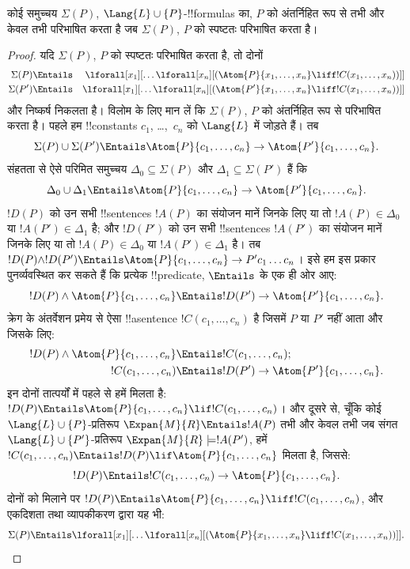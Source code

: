 \documentclass[../../../include/open-logic-section]{subfiles}
\begin{document}
\begin{thm}[बेथ का परिभाषणीयता प्रमेय] कोई समुच्चय $\Sigma(P)$,
  $\Lang{L}
  \cup\{P\}$-!!{formula}s का, $P$ को अंतर्निहित रूप से तभी और केवल तभी
  परिभाषित करता है जब $\Sigma(P)$, $P$ को स्पष्टतः परिभाषित करता है।
\end{thm}

\begin{proof}
यदि $\Sigma(P)$, $P$ को स्पष्टतः परिभाषित करता है, तो दोनों
\begin{align*}
  \Sigma(P) & \Entails & \lforall[x_1][\dots \lforall[x_n]
    [(\Atom{P}{x_1,\dots, x_n} \liff !C(x_1,\dots,x_n))]]\\
  \Sigma(P') & \Entails & \lforall[x_1][\dots \lforall[x_n]
    [(\Atom{P'}{x_1,\dots, x_n} \liff !C(x_1,\dots,x_n))]]
\end{align*}
और निष्कर्ष निकलता है। विलोम के लिए मान लें कि $\Sigma(P)$, $P$ को
अंतर्निहित रूप से परिभाषित करता है। पहले हम !!{constant}s $c_1$,
\dots,~$c_n$ को $\Lang{L}$ में जोड़ते हैं। तब
\[
\Sigma(P) \cup \Sigma(P') \Entails
\Atom{P}{c_1, \dots, c_n} \to  \Atom{P'}{c_1, \dots, c_n}.
\]
संहतता से ऐसे परिमित समुच्चय $\Delta_0 \subseteq \Sigma(P)$ और
$\Delta_1 \subseteq \Sigma(P')$ हैं कि
\[
\Delta_0 \cup \Delta_1 \Entails
\Atom{P}{c_1, \dots, c_n} \to \Atom{P'}{c_1, \dots, c_n}.
\]
$!D(P)$ को उन सभी !!{sentence}s $!A(P)$ का संयोजन मानें जिनके लिए या तो
$!A(P) \in \Delta_0$ या $!A(P') \in \Delta_1$ है; और $!D(P')$ को उन
सभी !!{sentence}s $!A(P')$ का संयोजन मानें जिनके लिए या तो
$!A(P) \in \Delta_0$ या $!A(P') \in \Delta_1$ है। तब $!D(P) \land
!D(P') \Entails \Atom{P}{c_1, \dots, c_n} \to P'c_1\dots c_n$। इसे
हम इस प्रकार पुनर्व्यवस्थित कर सकते हैं कि प्रत्येक !!{predicate},
$\Entails$ के एक ही ओर आए:
\[
!D(P) \land \Atom{P}{c_1, \dots, c_n} \Entails
!D(P') \to \Atom{P'}{c_1, \dots, c_n}.
\]
क्रेग के अंतर्वेशन प्रमेय से ऐसा !!a{sentence} $!C(c_1,\dots, c_n)$ है
जिसमें $P$ या $P'$ नहीं आता और जिसके लिए:
\begin{align*}
  {}!D(P) \land \Atom{P}{c_1, \dots, c_n} & \Entails !C(c_1,\dots, c_n); \\
  {}!C(c_1,\dots, c_n) & \Entails !D(P') \to \Atom{P'}{c_1, \dots, c_n}.
\end{align*}
इन दोनों तात्पर्यों में पहले से हमें मिलता है: $!D(P) \Entails
\Atom{P}{c_1,\dots, c_n} \lif !C(c_1,\dots, c_n)$। और दूसरे से, चूँकि
कोई $\Lang{L} \cup \{P\}$-प्रतिरूप $\Expan{M}{R}
\Entails !A(P)$ तभी और केवल तभी जब संगत $\Lang{L} \cup
\{P'\}$-प्रतिरूप $\Expan{M}{R} \models !A(P')$, हमें
$!C(c_1,\dots, c_n) \Entails !D(P) \lif \Atom{P}{c_1,\dots, c_n}$
मिलता है, जिससे:
\[
!D(P) \Entails !C(c_1,\dots,c_n) \to \Atom{P}{c_1,\dots, c_n}.
\]
दोनों को मिलाने पर $!D(P) \Entails \Atom{P}{c_1,\dots, c_n}
\liff !C(c_1, \dots, c_n)$, और एकदिशता तथा व्यापकीकरण द्वारा यह भी:
\[
\Sigma(P) \Entails
\lforall[x_1][\dots\lforall[x_n][(\Atom{P}{x_1,\dots, x_n} \liff
    !C(x_1,\dots, x_n))]].
\]
\end{proof}
\end{document}
